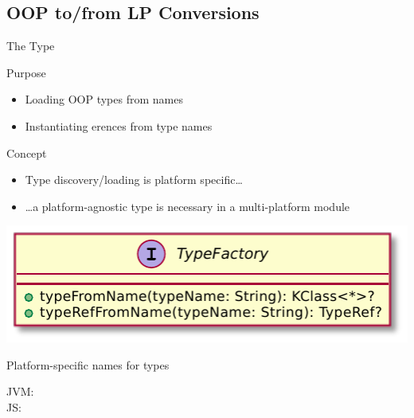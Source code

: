 \documentclass[handout]{beamer}
\begin{document}
\subsection{OOP to/from LP Conversions}

\begin{frame}[allowframebreaks]{The  Type}
    \begin{block}{Purpose}
        \begin{itemize}
            \item Loading OOP types from names
            \item Instantiating erences from type names
        \end{itemize}
    \end{block}

    \begin{alertblock}{Concept}
        \begin{itemize}
            \item Type discovery/loading is platform specific\ldots
            \item \ldots a platform-agnostic type is necessary in a multi-platform module
        \end{itemize}
    \end{alertblock}

    \framebreak

    \begin{center}
        \includegraphics[width=.5\linewidth]{img/TypeFactory.pdf}
    \end{center}

    \framebreak

    \begin{alertblock}{Platform-specific names for types}
        \begin{description}
            \item[JVM:] 
            \item[JS:]   
        \end{description}
    \end{alertblock}
\end{frame}
\end{document}
